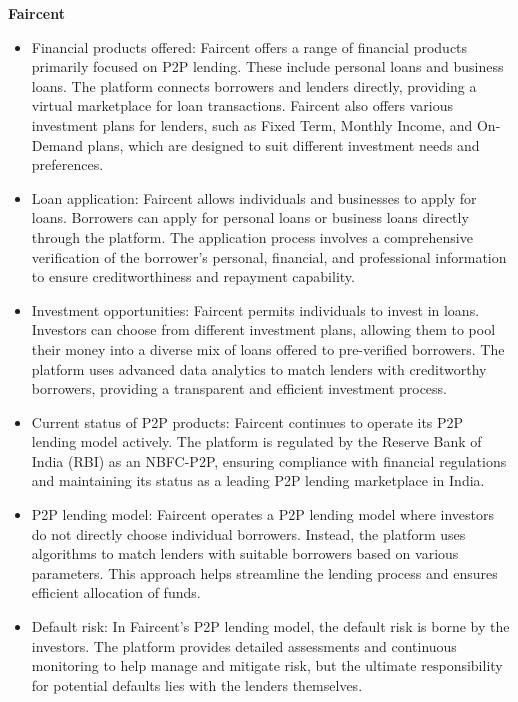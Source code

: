 \documentclass[pdflatex,sn-apa]{sn-jnl}%
\theoremstyle{thmstyleone}%
\theoremstyle{thmstyletwo}%
\theoremstyle{thmstylethree}%
\begin{document}
\vspace{1\baselineskip}
\textbf{Faircent}
    \begin{itemize}
        \item Financial products offered: Faircent offers a range of financial products primarily focused on P2P lending. These include personal loans and business loans. The platform connects borrowers and lenders directly, providing a virtual marketplace for loan transactions. Faircent also offers various investment plans for lenders, such as Fixed Term, Monthly Income, and On-Demand plans, which are designed to suit different investment needs and preferences.
        
        \item Loan application: Faircent allows individuals and businesses to apply for loans. Borrowers can apply for personal loans or business loans directly through the platform. The application process involves a comprehensive verification of the borrower’s personal, financial, and professional information to ensure creditworthiness and repayment capability.
        
        \item Investment opportunities: Faircent permits individuals to invest in loans. Investors can choose from different investment plans, allowing them to pool their money into a diverse mix of loans offered to pre-verified borrowers. The platform uses advanced data analytics to match lenders with creditworthy borrowers, providing a transparent and efficient investment process.
        
        \item Current status of P2P products: Faircent continues to operate its P2P lending model actively. The platform is regulated by the Reserve Bank of India (RBI) as an NBFC-P2P, ensuring compliance with financial regulations and maintaining its status as a leading P2P lending marketplace in India.
        
        \item P2P lending model: Faircent operates a P2P lending model where investors do not directly choose individual borrowers. Instead, the platform uses algorithms to match lenders with suitable borrowers based on various parameters. This approach helps streamline the lending process and ensures efficient allocation of funds.
        
        \item Default risk: In Faircent’s P2P lending model, the default risk is borne by the investors. The platform provides detailed assessments and continuous monitoring to help manage and mitigate risk, but the ultimate responsibility for potential defaults lies with the lenders themselves.
    \end{itemize}
\end{document}
